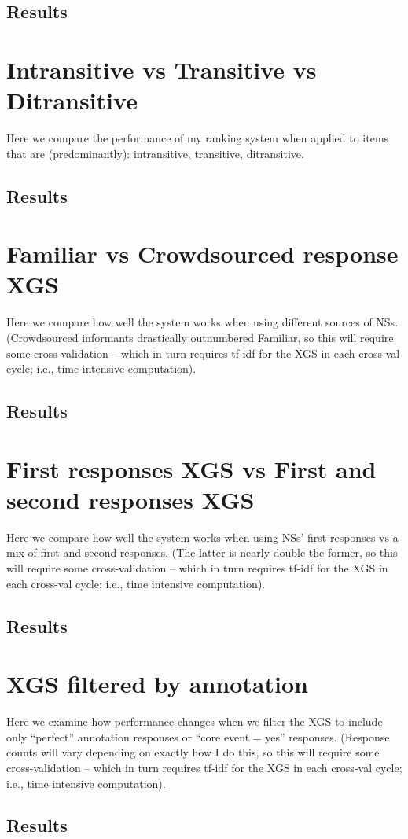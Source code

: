 \subsection{Results}
\label{subsection:targeted-results}

\section{Intransitive vs Transitive vs Ditransitive}
\label{section:experiment-transitive}
Here we compare the performance of my ranking system when applied to items that are (predominantly): intransitive, transitive, ditransitive.
\subsection{Results}
\label{subsection:transitive-results}

\section{Familiar vs Crowdsourced response XGS}
\label{section:experiment-crowdsource}
Here we compare how well the system works when using different sources of NSs. (Crowdsourced informants drastically outnumbered Familiar, so this will require some cross-validation -- which in turn requires tf-idf for the XGS in each cross-val cycle; i.e., time intensive computation).
\subsection{Results}
\label{subsection:crowdsource-results}

\section{First responses XGS vs First and second responses XGS}
\label{section:experiment-first-responses}
Here we compare how well the system works when using NSs' first responses vs a mix of first and second responses. (The latter is nearly double the former, so this will require some cross-validation -- which in turn requires tf-idf for the XGS in each cross-val cycle; i.e., time intensive computation).
\subsection{Results}
\label{subsection:first-responses-results}

\section{XGS filtered by annotation}
\label{section:experiment-filtered}
Here we examine how performance changes when we filter the XGS to include only ``perfect'' annotation responses or ``core event = yes'' responses. (Response counts will vary depending on exactly how I do this, so this will require some cross-validation -- which in turn requires tf-idf for the XGS in each cross-val cycle; i.e., time intensive computation).
\subsection{Results}
\label{subsection:filtered-results}
